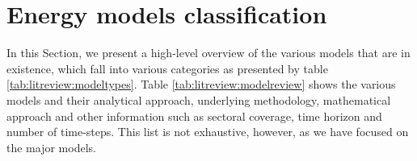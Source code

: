 \section{Energy models classification}
\label{sec:litreview:modelclassification}

In this Section, we present a high-level overview of the various models that are in existence, which fall into various categories as presented by table \ref{tab:litreview:modeltypes}. Table \ref{tab:litreview:modelreview} shows the various models and their analytical approach, underlying methodology, mathematical approach and other information such as sectoral coverage, time horizon and number of time-steps. This list is not exhaustive, however, as we have focused on the major models. 

